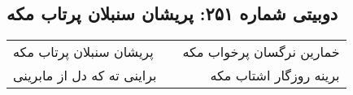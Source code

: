 \begin{center}
\section*{دوبیتی شماره ۲۵۱: پریشان سنبلان پرتاب مکه}
\label{sec:251}
\begin{longtable}{l p{0.5cm} r}
پریشان سنبلان پرتاب مکه
&&
خمارین نرگسان پرخواب مکه
\\
براینی ته که دل از مابرینی
&&
برینه روزگار اشتاب مکه
\\
\end{longtable}
\end{center}
